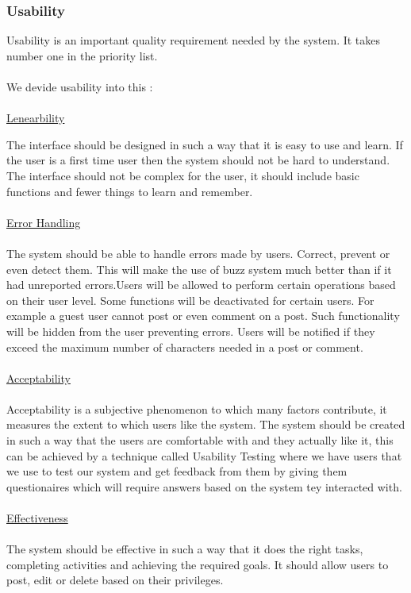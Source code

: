 ﻿\subsubsection{Usability}
Usability is an important quality requirement needed by the system. It takes number one in the priority list. \\
\\ We devide usability into this :\\
\\
\underline{Lenearbility\\}

The interface should be designed in such a way that it is easy to use and learn. If the user is a first time user then the system should not be hard to understand. The interface should not be complex for the user, it should include basic functions and fewer things to learn and remember.\\
\\
\underline{Error Handling\\}
\\The system should be able to handle errors made by users. Correct, prevent or even detect them. This will make the use of buzz system much better than  if it had unreported errors.Users will be allowed to perform certain operations based on their user level. Some functions will be deactivated for certain users. For example a guest user cannot post or even comment on a post. Such functionality will be hidden from the user preventing errors. Users will be notified if they exceed the maximum number of characters needed in a post or comment.\\
\\
\underline{Acceptability\\}
\\
Acceptability is a subjective phenomenon to which many factors contribute, it measures the extent to which users like the system. The system should be created in such a way that the users are comfortable with and they actually like it, this can be achieved by  a technique called Usability Testing where  we have users that we use to test our system and get feedback from them by giving them questionaires which will require answers based on the system tey interacted with.\\
\\
\underline{Effectiveness \\}
\\The system should be effective in such a way that it does the right tasks, completing activities and achieving the required goals. It should allow users to post, edit or delete based on their privileges.\\

